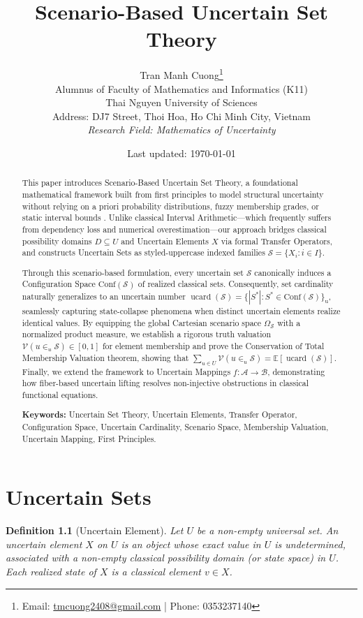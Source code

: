 \documentclass[a4paper,12pt, twoside]{memoir}
\title{Scenario-Based Uncertain Set Theory}
\author{
	Tran Manh Cuong\thanks{Email: \href{mailto:tmcuong2408@gmail.com}{tmcuong2408@gmail.com} | Phone: 0353237140} \\[0.5em]
	\small Alumnus of Faculty of Mathematics and Informatics (K11)
	\\ Thai Nguyen University of Sciences \\
	\small Address: DJ7 Street, Thoi Hoa, Ho Chi Minh City, Vietnam \\
	\small \textit{Research Field: Mathematics of Uncertainty}
}
\date{Last updated: \today}
\newtheorem{definition}{Definition}[chapter]
\DeclareMathOperator{\UCARD}{ucard}
\newcommand{\tbd}[1]{\mathcal{#1}} %
\newcommand{\s}[1]{\{#1\}_\mathrm{u}} %
\begin{document}
	
	\maketitle
	
	\begin{abstract}
		This paper introduces Scenario-Based Uncertain Set Theory, a foundational mathematical framework built from first principles to model structural uncertainty without relying on a priori probability distributions, fuzzy membership grades, or static interval bounds \cite{tran2026extended}. Unlike classical Interval Arithmetic—which frequently suffers from dependency loss and numerical overestimation—our approach bridges classical possibility domains $D \subseteq U$ and Uncertain Elements $X$ via formal Transfer Operators, and constructs Uncertain Sets as styled-uppercase indexed families $\tbd{S} = \{X_i : i \in I\}$.
		
		Through this scenario-based formulation, every uncertain set $\tbd{S}$ canonically induces a Configuration Space $\mathrm{Conf}(\tbd{S})$ of realized classical sets. Consequently, set cardinality naturally generalizes to an uncertain number $\UCARD(\tbd{S}) = \s{|S^*| : S^* \in \mathrm{Conf}(\tbd{S})}$, seamlessly capturing state-collapse phenomena when distinct uncertain elements realize identical values. By equipping the global Cartesian scenario space $\Omega_{\tbd{S}}$ with a normalized product measure, we establish a rigorous truth valuation $\mathcal{V}(u \in_u \tbd{S}) \in [0, 1]$ for element membership and prove the Conservation of Total Membership Valuation theorem, showing that $\sum_{u \in U} \mathcal{V}(u \in_u \tbd{S}) = \mathbb{E}[\UCARD(\tbd{S})]$. Finally, we extend the framework to Uncertain Mappings $f : \tbd{A} \to \tbd{B}$, demonstrating how fiber-based uncertain lifting resolves non-injective obstructions in classical functional equations.
		
		\vspace{1em}
		\noindent \textbf{Keywords:} Uncertain Set Theory, Uncertain Elements, Transfer Operator, Configuration Space, Uncertain Cardinality, Scenario Space, Membership Valuation, Uncertain Mapping, First Principles.
	\end{abstract}
	
	\chapter{Uncertain Sets}
	
	\begin{definition}[Uncertain Element]
		Let $U$ be a non-empty universal set. An uncertain element $X$ on $U$ is an object whose exact value in $U$ is undetermined, associated with a non-empty classical possibility domain (or state space) in $U$. Each realized state of $X$ is a classical element $v \in X$.
	\end{definition}
	
\end{document}
